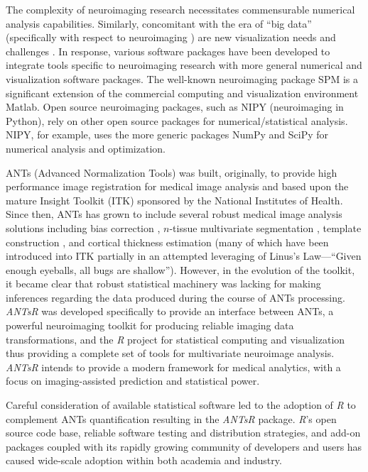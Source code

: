 \documentclass[preprint,authoryear,review,12pt]{elsarticle}
\begin{document}
The complexity of neuroimaging research necessitates 
commensurable numerical analysis capabilities.  Similarly, concomitant
with the era of ``big data'' (specifically with respect to neuroimaging
\citep{vanhorn2013}) are new visualization needs and challenges
\citep{childs2013,kehrer2013}.
In response, various software packages have been developed to
integrate tools specific to neuroimaging research with more general
numerical and visualization software packages.
The well-known neuroimaging package SPM
is a significant extension of the commercial computing and visualization environment
Matlab.  Open source neuroimaging packages, such as NIPY (neuroimaging in Python),
rely on other open source packages for numerical/statistical analysis.  NIPY,
for example, uses the more generic packages NumPy and SciPy for numerical analysis and 
optimization.

ANTs (Advanced Normalization Tools) was built, originally, to provide 
high performance image registration for medical image analysis
\citep{avants2008a} and based upon the mature Insight Toolkit (ITK)
sponsored by the National Institutes of Health.  Since then, ANTs has grown to include 
several robust medical image analysis solutions including bias 
correction \citep{tustison2010}, $n$-tissue multivariate segmentation 
\citep{avants2011}, template construction \citep{avants2010}, and cortical 
thickness estimation \citep{das2009} (many of which have been
introduced into ITK partially in an attempted leveraging of Linus's Law---``Given enough eyeballs, all bugs are shallow'').  
However, in the evolution of the toolkit, it became clear 
that robust statistical machinery was lacking for making inferences regarding
the data produced during the course of ANTs processing.  \textit{ANTsR} was developed
specifically to provide an interface between ANTs, a 
powerful neuroimaging toolkit for producing reliable imaging data 
transformations, and the \textit{R} project
for statistical computing and visualization thus providing a complete
set of tools for multivariate neuroimage analysis.  
 \textit{ANTsR} intends to provide a modern framework for medical analytics, 
 with a focus on imaging-assisted prediction and statistical power.


Careful consideration of available statistical software 
led to the adoption of \textit{R} to complement ANTs quantification resulting in the
\textit{ANTsR} package.
\textit{R}'s open source code base, reliable software testing and distribution strategies,
and add-on packages coupled with its rapidly growing 
community of developers and users has caused wide-scale
adoption within both academia and industry.
\end{document}
